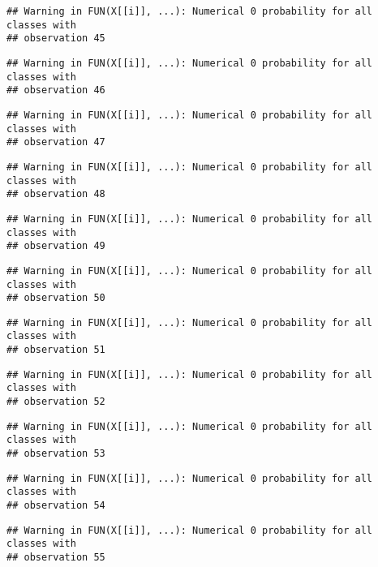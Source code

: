 \documentclass[
]{article}
\begin{document}
\begin{verbatim}
## Warning in FUN(X[[i]], ...): Numerical 0 probability for all classes with
## observation 45
\end{verbatim}

\begin{verbatim}
## Warning in FUN(X[[i]], ...): Numerical 0 probability for all classes with
## observation 46
\end{verbatim}

\begin{verbatim}
## Warning in FUN(X[[i]], ...): Numerical 0 probability for all classes with
## observation 47
\end{verbatim}

\begin{verbatim}
## Warning in FUN(X[[i]], ...): Numerical 0 probability for all classes with
## observation 48
\end{verbatim}

\begin{verbatim}
## Warning in FUN(X[[i]], ...): Numerical 0 probability for all classes with
## observation 49
\end{verbatim}

\begin{verbatim}
## Warning in FUN(X[[i]], ...): Numerical 0 probability for all classes with
## observation 50
\end{verbatim}

\begin{verbatim}
## Warning in FUN(X[[i]], ...): Numerical 0 probability for all classes with
## observation 51
\end{verbatim}

\begin{verbatim}
## Warning in FUN(X[[i]], ...): Numerical 0 probability for all classes with
## observation 52
\end{verbatim}

\begin{verbatim}
## Warning in FUN(X[[i]], ...): Numerical 0 probability for all classes with
## observation 53
\end{verbatim}

\begin{verbatim}
## Warning in FUN(X[[i]], ...): Numerical 0 probability for all classes with
## observation 54
\end{verbatim}

\begin{verbatim}
## Warning in FUN(X[[i]], ...): Numerical 0 probability for all classes with
## observation 55
\end{verbatim}
\end{document}
